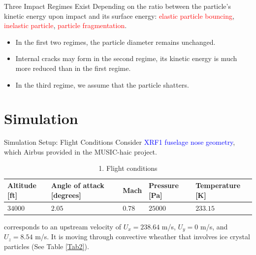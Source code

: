 \documentclass[aspectratio=169,xcolor=dvipsnames]{beamer}
\begin{document}
\begin{frame}{Three Impact Regimes Exist}
Depending on the ratio between the particle's kinetic energy upon impact and its surface energy: \textcolor{red}{elastic particle bouncing}, \textcolor{red}{inelastic particle}, \textcolor{red}{particle fragmentation}.
   \begin{itemize}
       \item In the first two regimes, the particle diameter remains unchanged. 
       \item Internal cracks may form in the second regime, its kinetic energy is much more reduced than in the first regime.
       \item In the third regime, we assume that the particle shatters.
   \end{itemize}
\end{frame}


\section{Simulation}
\begin{frame}{Simulation Setup: Flight Conditions}
 Consider \textcolor{blue}{XRF1 fuselage nose geometry}, which Airbus provided in the MUSIC-haic project. 
\begin{table}[H]
\begin{tabular}{lllll}
\hline
\multicolumn{1}{|l|}{Altitude [ft]} & \multicolumn{1}{l|}{Angle of attack [degrees]} & \multicolumn{1}{l|}{Mach} & \multicolumn{1}{l|}{Pressure [Pa]} & \multicolumn{1}{l|}{Temperature [K]} \\ \hline
\multicolumn{1}{|l|}{$34000$} & \multicolumn{1}{l|}{$2.05$} & \multicolumn{1}{l|}{$0.78$} & \multicolumn{1}{l|}{$25000$} & \multicolumn{1}{l|}{$233.15$} \\ \hline 
\end{tabular}
\caption{1. Flight conditions}
\label{Tab1}
\end{table}
corresponds to an upstream velocity of $U_x = 238.64$ m/s, $U_y = 0$ m/s, and $U_z = 8.54$ m/s. It is moving through convective wheather that involves ice crystal particles (See Table \ref{Tab2}).
\end{frame}
\end{document}
